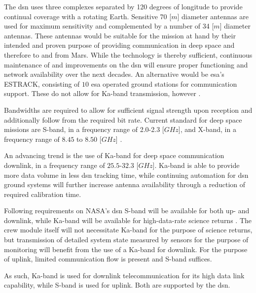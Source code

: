 The \gls{dsn} uses three complexes separated by 120 degrees of longitude to provide continual coverage with a rotating Earth. Sensitive 70 [$m$] diameter antennas are used for maximum sensitivity and complemented by a number of 34 [$m$] diameter antennas. \cite{Wertz2011} These antennas would be suitable for the mission at hand by their intended and proven purpose of providing communication in deep space and therefore to and from Mars. While the technology is thereby sufficient, continuous maintenance of and improvements on the \gls{dsn} will ensure proper functioning and network availability over the next decades. An alternative would be \gls{esa}'s ESTRACK, consisting of $10$ \gls{esa} operated ground stations for communication support. These do not allow for Ka-band transmission, however \cite{Wertz2011}.

Bandwidths are required to allow for sufficient signal strength upon reception and additionally follow from the required bit rate. Current standard for deep space missions are S-band, in a frequency range of 2.0-2.3 [$GHz$], and X-band, in a frequency range of $8.45$ to $8.50$ [$GHz$] \cite{Wertz2011}.

An advancing trend is the use of Ka-band for deep space communication downlink, in a frequency range of $25.5$-$32.3$ [$GHz$]. Ka-band is able to provide more data volume in less \gls{dsn} tracking time, while continuing automation for \gls{dsn} ground systems will further increase antenna availability through a reduction of required calibration time\cite{Edwards1999}. 

Following requirements on NASA's \gls{dsn} S-band will be available for both up- and downlink, while Ka-band will be available for high-data-rate science returns \cite{Labelle2012}. The crew module itself will not necessitate Ka-band for the purpose of science returns, but transmission of detailed system state measured by sensors for the purpose of monitoring will benefit from the use of a Ka-band for downlink. For the purpose of uplink, limited communication flow is present and S-band suffices.%

As such, Ka-band is used for downlink telecommunication for its high data link capability, while S-band is used for uplink. Both are supported by the \gls{dsn}.

